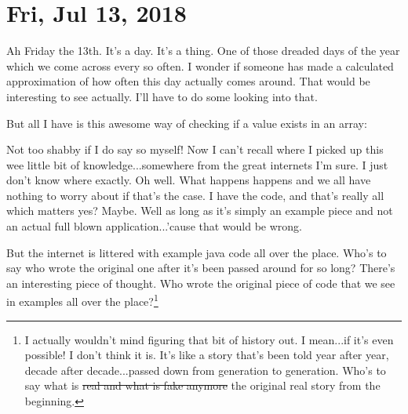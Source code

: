 \section{Fri, Jul 13, 2018}

Ah Friday the 13th. It's a day. It's a thing. One of those dreaded days of the
year which we come across every so often. I wonder if someone has made a
calculated approximation of how often this day actually comes around. That would
be interesting to see actually. I'll have to do some looking into that.

But all I have is this awesome way of checking if a value exists in an array:



Not too shabby if I do say so myself! Now I can't recall where I picked up this
wee little bit of knowledge...somewhere from the great internets I'm sure. I
just don't know where exactly. Oh well. What happens happens and we all have
nothing to worry about if that's the case. I have the code, and that's really
all which matters yes? Maybe. Well as long as it's simply an example piece and
not an actual full blown application...'cause that would be wrong.

But the internet is littered with example java code all over the place. Who's to
say who wrote the original one after it's been passed around for so long?
There's an interesting piece of thought. Who wrote the original piece of code
that we see in examples all over the place?\footnote{
I actually wouldn't mind figuring that bit of history out. I mean...if it's even
possible! I don't think it is. It's like a story that's been told year after
year, decade after decade...passed down from generation to generation. Who's to
say what is \st{real and what is fake anymore} the original real story from the 
beginning.
}
